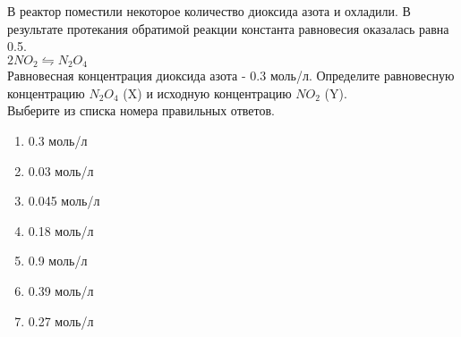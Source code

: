 В реактор поместили некоторое количество диоксида азота и охладили. В результате протекания обратимой реакции константа равновесия оказалась равна 0.5.\\
$2 NO_2 \leftrightharpoons N_2O_4$ \\
Равновесная концентрация диоксида азота - 0.3 моль/л. Определите равновесную концентрацию $N_2O_4$ (X) и исходную концентрацию $NO_2$ (Y).\\
Выберите из списка номера правильных ответов.
\begin{enumerate}
    \item 0.3 моль/л
    \item 0.03 моль/л
    \item 0.045 моль/л
    \item 0.18 моль/л
    \item 0.9 моль/л 
    \item 0.39 моль/л
    \item 0.27 моль/л
\end{enumerate}
